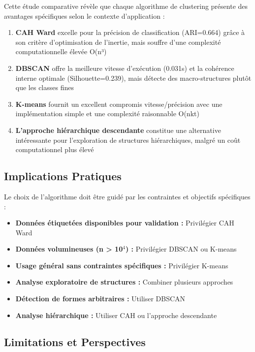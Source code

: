 \documentclass[12pt,a4paper]{article}
\begin{document}
Cette étude comparative révèle que chaque algorithme de clustering présente des avantages spécifiques selon le contexte d'application :

\begin{enumerate}
    \item \textbf{CAH Ward} excelle pour la précision de classification (ARI=0.664) grâce à son critère d'optimisation de l'inertie, mais souffre d'une complexité computationnelle élevée O(n³)
    
    \item \textbf{DBSCAN} offre la meilleure vitesse d'exécution (0.031s) et la cohérence interne optimale (Silhouette=0.239), mais détecte des macro-structures plutôt que les classes fines
    
    \item \textbf{K-means} fournit un excellent compromis vitesse/précision avec une implémentation simple et une complexité raisonnable O(nkt)
    
    \item \textbf{L'approche hiérarchique descendante} constitue une alternative intéressante pour l'exploration de structures hiérarchiques, malgré un coût computationnel plus élevé
\end{enumerate}

\subsection{Implications Pratiques}

Le choix de l'algorithme doit être guidé par les contraintes et objectifs spécifiques :

\begin{itemize}
    \item \textbf{Données étiquetées disponibles pour validation :} Privilégier CAH Ward
    \item \textbf{Données volumineuses (n > 10$^4$) :} Privilégier DBSCAN ou K-means
    \item \textbf{Usage général sans contraintes spécifiques :} Privilégier K-means
    \item \textbf{Analyse exploratoire de structures :} Combiner plusieurs approches
    \item \textbf{Détection de formes arbitraires :} Utiliser DBSCAN
    \item \textbf{Analyse hiérarchique :} Utiliser CAH ou l'approche descendante
\end{itemize}

\subsection{Limitations et Perspectives}
\end{document}
